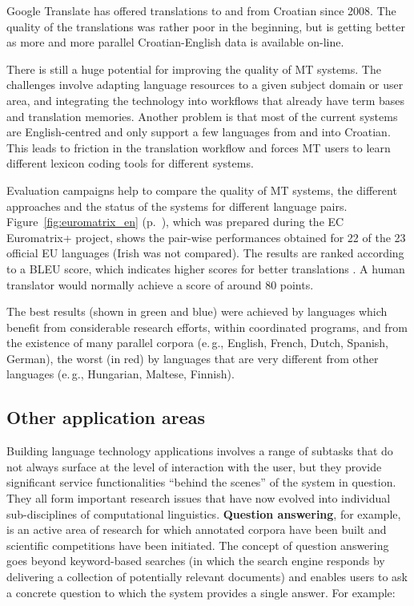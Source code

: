 \begin{multicols}{2}
Google Translate has offered translations to and from Croatian since 2008. The quality of the translations was rather poor in the beginning, but is getting better as more and more parallel Croatian-English data is available on-line.

There is still a huge potential for improving the quality of MT systems. The challenges involve adapting language resources to a given subject domain or user area, and integrating the technology into workflows that already have term bases and translation memories. Another problem is that most of the current systems are English-centred and only support a few languages from and into Croatian. This leads to friction in the translation workflow and forces MT users to learn different lexicon coding tools for different systems.

Evaluation campaigns help to compare the quality of MT systems, the different approaches and the status of the systems for different language pairs. Figure~\ref{fig:euromatrix_en} (p.~\pageref{fig:euromatrix_en}), which was prepared during the EC Euromatrix+ project, shows the pair-wise performances obtained for 22 of the 23 official EU languages (Irish was not compared). The results are ranked according to a BLEU score, which indicates higher scores for better translations \cite{pro6}. A human translator would normally achieve a score of around 80 points.

The best results (shown in green and blue) were achieved by languages which benefit from considerable research efforts, within coordinated programs, and from the existence of many parallel corpora (e.\,g., English, French, Dutch, Spanish, German), the worst (in red) by languages that are very different from other languages (e.\,g., Hungarian, Maltese, Finnish).

\subsection{Other application areas}

Building language technology applications involves a range of subtasks that do not always surface at the level of interaction with the user, but they provide significant service functionalities “behind the scenes” of the system in question. They all form important research issues that have now evolved into individual sub-disciplines of computational linguistics. \textbf{Question answering}, for example, is an active area of research for which annotated corpora have been built and scientific competitions have been initiated. The concept of question answering goes beyond keyword-based searches (in which the search engine responds by delivering a collection of potentially relevant documents) and enables users to ask a concrete question to which the system provides a single answer. For example:


\end{multicols}
